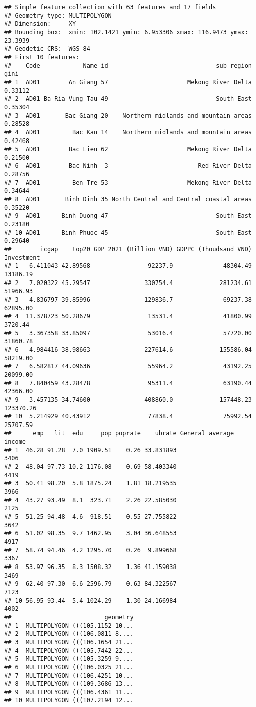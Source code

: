 \documentclass[
]{article}
\begin{document}
\begin{verbatim}
## Simple feature collection with 63 features and 17 fields
## Geometry type: MULTIPOLYGON
## Dimension:     XY
## Bounding box:  xmin: 102.1421 ymin: 6.953306 xmax: 116.9473 ymax: 23.3939
## Geodetic CRS:  WGS 84
## First 10 features:
##    Code            Name id                              sub region    gini
## 1  AD01        An Giang 57                      Mekong River Delta 0.33112
## 2  AD01 Ba Ria Vung Tau 49                              South East 0.35304
## 3  AD01       Bac Giang 20    Northern midlands and mountain areas 0.28528
## 4  AD01         Bac Kan 14    Northern midlands and mountain areas 0.42468
## 5  AD01        Bac Lieu 62                      Mekong River Delta 0.21500
## 6  AD01        Bac Ninh  3                         Red River Delta 0.28756
## 7  AD01         Ben Tre 53                      Mekong River Delta 0.34644
## 8  AD01       Binh Dinh 35 North Central and Central coastal areas 0.35220
## 9  AD01      Binh Duong 47                              South East 0.23180
## 10 AD01      Binh Phuoc 45                              South East 0.29640
##        icgap    top20 GDP 2021 (Billion VND) GDPPC (Thoudsand VND) Investment
## 1   6.411043 42.89568                92237.9              48304.49   13186.19
## 2   7.020322 45.29547               330754.4             281234.61   51966.93
## 3   4.836797 39.85996               129836.7              69237.38   62895.00
## 4  11.378723 50.28679                13531.4              41800.99    3720.44
## 5   3.367358 33.85097                53016.4              57720.00   31860.78
## 6   4.984416 38.98663               227614.6             155586.04   58219.00
## 7   6.582817 44.09636                55964.2              43192.25   20099.00
## 8   7.840459 43.28478                95311.4              63190.44   42366.00
## 9   3.457135 34.74600               408860.0             157448.23  123370.26
## 10  5.214929 40.43912                77838.4              75992.54   25707.59
##      emp   lit  edu     pop poprate    ubrate General average income
## 1  46.28 91.28  7.0 1909.51    0.26 33.831893                   3406
## 2  48.04 97.73 10.2 1176.08    0.69 58.403340                   4419
## 3  50.41 98.20  5.8 1875.24    1.81 18.219535                   3966
## 4  43.27 93.49  8.1  323.71    2.26 22.585030                   2125
## 5  51.25 94.48  4.6  918.51    0.55 27.755822                   3642
## 6  51.02 98.35  9.7 1462.95    3.04 36.648553                   4917
## 7  58.74 94.46  4.2 1295.70    0.26  9.899668                   3367
## 8  53.97 96.35  8.3 1508.32    1.36 41.159038                   3469
## 9  62.40 97.30  6.6 2596.79    0.63 84.322567                   7123
## 10 56.95 93.44  5.4 1024.29    1.30 24.166984                   4002
##                          geometry
## 1  MULTIPOLYGON (((105.1152 10...
## 2  MULTIPOLYGON (((106.0811 8....
## 3  MULTIPOLYGON (((106.1654 21...
## 4  MULTIPOLYGON (((105.7442 22...
## 5  MULTIPOLYGON (((105.3259 9....
## 6  MULTIPOLYGON (((106.0325 21...
## 7  MULTIPOLYGON (((106.4251 10...
## 8  MULTIPOLYGON (((109.3686 13...
## 9  MULTIPOLYGON (((106.4361 11...
## 10 MULTIPOLYGON (((107.2194 12...
\end{verbatim}
\end{document}

